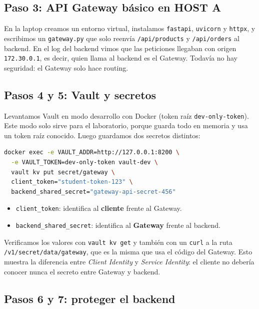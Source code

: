 \documentclass[11pt,a4paper]{article}
\begin{document}
\subsection{Paso 3: API Gateway básico en HOST A}

En la laptop creamos un entorno virtual, instalamos \texttt{fastapi}, \texttt{uvicorn} y \texttt{httpx}, y escribimos un \texttt{gateway.py} que solo reenvía \texttt{/api/products} y \texttt{/api/orders} al backend. En el log del backend vimos que las peticiones llegaban con origen \texttt{172.30.0.1}, es decir, quien llama al backend es el Gateway. Todavía no hay seguridad: el Gateway solo hace routing.

\subsection{Pasos 4 y 5: Vault y secretos}

Levantamos Vault en modo desarrollo con Docker (token raíz \texttt{dev-only-token}). Este modo solo sirve para el laboratorio, porque guarda todo en memoria y usa un token raíz conocido. Luego guardamos dos secretos distintos:

\begin{lstlisting}[language=bash]
docker exec -e VAULT_ADDR=http://127.0.0.1:8200 \
  -e VAULT_TOKEN=dev-only-token vault-dev \
  vault kv put secret/gateway \
  client_token="student-token-123" \
  backend_shared_secret="gateway-api-secret-456"
\end{lstlisting}

\begin{itemize}[noitemsep]
  \item \texttt{client\_token}: identifica al \textbf{cliente} frente al Gateway.
  \item \texttt{backend\_shared\_secret}: identifica al \textbf{Gateway} frente al backend.
\end{itemize}

Verificamos los valores con \texttt{vault kv get} y también con un \texttt{curl} a la ruta \texttt{/v1/secret/data/gateway}, que es la misma que usa el código del Gateway. Esto muestra la diferencia entre \textit{Client Identity} y \textit{Service Identity}: el cliente no debería conocer nunca el secreto entre Gateway y backend.

\subsection{Pasos 6 y 7: proteger el backend}
\end{document}
